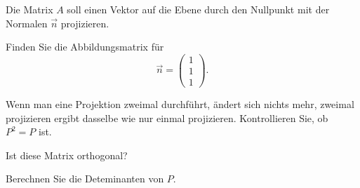 Die Matrix $A$ soll einen Vektor auf die Ebene durch den
Nullpunkt mit der Normalen $\vec n$ projizieren.
\begin{teilaufgaben}
\item
Finden Sie die Abbildungsmatrix für
\[
\vec n=\begin{pmatrix}1\\1\\1\end{pmatrix}.
\]
\item
Wenn man eine Projektion zweimal durchführt, ändert sich nichts mehr,
zweimal projizieren ergibt dasselbe wie nur einmal projizieren.
Kontrollieren Sie, ob $P^2=P$ ist.
\item
Ist diese Matrix orthogonal?
\item
Berechnen Sie die Deteminanten von $P$.
\end{teilaufgaben}

